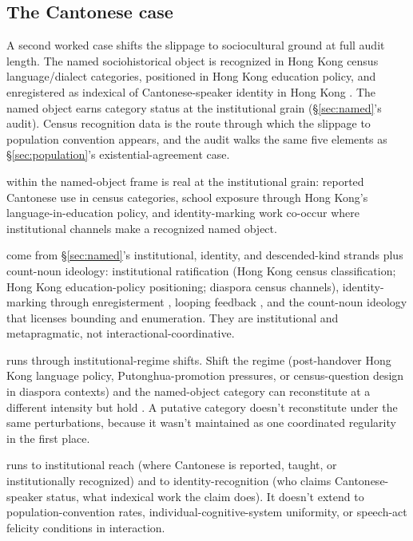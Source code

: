 \documentclass[12pt]{article}
\begin{document}
\subsection{The Cantonese case}\label{sec:slippage-cantonese}

A second worked case shifts the slippage to sociocultural ground at full audit length. The named sociohistorical object  is recognized in Hong Kong census language/dialect categories, positioned in Hong Kong education policy, and enregistered as indexical of Cantonese-speaker identity in Hong Kong \citep{hongKongCensus2021,leeLeung2012Cantonese}. The named object earns category status at the institutional grain (§\ref{sec:named}'s audit). Census recognition data is the route through which the slippage to population convention appears, and the audit walks the same five elements as §\ref{sec:population}'s existential-agreement case.

 within the named-object frame is real at the institutional grain: reported Cantonese use in census categories, school exposure through Hong Kong's language-in-education policy, and identity-marking work co-occur where institutional channels make  a recognized named object.

 come from §\ref{sec:named}'s institutional, identity, and descended-kind strands plus count-noun ideology: institutional ratification (Hong Kong census classification; Hong Kong education-policy positioning; diaspora census channels), identity-marking through enregisterment \citep{agha2005}, looping feedback \citep{hacking1999}, and the count-noun ideology that licenses bounding and enumeration. They are institutional and metapragmatic, not interactional-coordinative.

 runs through institutional-regime shifts. Shift the regime (post-handover Hong Kong language policy, Putonghua-promotion pressures, or census-question design in diaspora contexts) and the named-object category can reconstitute at a different intensity but hold \citep{leeLeung2012Cantonese,statisticsCanada2022Language}. A putative  category doesn't reconstitute under the same perturbations, because it wasn't maintained as one coordinated regularity in the first place.

 runs to institutional reach (where Cantonese is reported, taught, or institutionally recognized) and to identity-recognition (who claims Cantonese-speaker status, what indexical work the claim does). It doesn't extend to population-convention rates, individual-cognitive-system uniformity, or speech-act felicity conditions in interaction.
\end{document}
